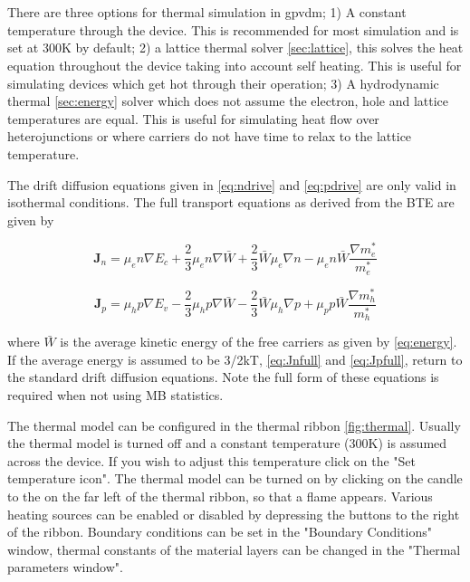 \section{}
There are three options for thermal simulation in gpvdm; 1) A constant temperature through the device. This is recommended for most simulation and is set at 300K by default; 2) a lattice thermal solver \ref{sec:lattice}, this solves the heat equation throughout the device taking into account self heating.  This is useful for simulating devices which get hot through their operation; 3) A hydrodynamic thermal \ref{sec:energy} solver which does not assume the electron, hole and lattice temperatures are equal.  This is useful for simulating heat flow over heterojunctions or where carriers do not have time to relax to the lattice temperature.

The drift diffusion equations given in \ref{eq:ndrive} and \ref{eq:pdrive} are only valid in isothermal conditions.  The full transport equations as derived from the BTE \cite{Azoff} are given by

\begin{equation}
\label{eq:Jnfull}
 \textbf{J}_n = \mu_e n \nabla E_c +\frac{2}{3} \mu_e n \nabla \bar{W} + \frac{2}{3} \bar{W} \mu_e \nabla n - \mu_e n \bar{W} \frac{\nabla m^*_e}{m^*_e}
\end{equation}


\begin{equation}
\label{eq:Jpfull}
 \textbf{J}_p = \mu_h p \nabla E_v -\frac{2}{3} \mu_h p \nabla \bar{W} - \frac{2}{3} \bar{W} \mu_h \nabla p + \mu_p p \bar{W} \frac{\nabla m^*_h}{m^*_h}
\end{equation}

where $\bar{W}$ is the average kinetic energy of the free carriers as given by \ref{eq:energy}.  If the average energy is assumed to be 3/2kT, \ref{eq:Jnfull} and \ref{eq:Jpfull}, return to the standard drift diffusion equations. Note the full form of these equations is required when not using MB statistics.

The thermal model can be configured in the thermal ribbon \ref{fig:thermal}. Usually the thermal model is turned off and a constant temperature (300K) is assumed across the device. If you wish to adjust this temperature click on the "Set temperature icon".  The thermal model can be turned on by clicking on the candle to the on the far left of the thermal ribbon, so that a flame appears.  Various heating sources can be enabled or disabled by depressing the buttons to the right of the ribbon. Boundary conditions can be set in the "Boundary Conditions" window, thermal constants of the material layers can be changed in the "Thermal parameters window".

